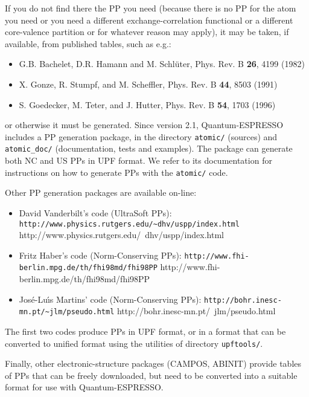 \documentclass[12pt,a4paper]{article}
\begin{document}
If you do not find there the PP you need (because there is no PP for
the atom you need or you need a different exchange-correlation
functional or a different core-valence partition or for whatever
reason may apply), it may be taken, if available, from published
tables, such as e.g.:
\begin{itemize}
  \item G.B. Bachelet, D.R. Hamann and M. Schl\"uter, Phys. Rev. B
        \textbf{26}, 4199 (1982)
  \item X. Gonze, R. Stumpf, and M. Scheffler, Phys. Rev. B
        \textbf{44}, 8503 (1991)
  \item S. Goedecker, M. Teter, and J. Hutter, Phys. Rev. B
        \textbf{54}, 1703 (1996)
\end{itemize}
or otherwise it must be generated. Since version 2.1, Quantum-ESPRESSO 
includes a PP generation package, in the
directory \texttt{atomic/} (sources) and \texttt{atomic\_doc/}
(documentation, tests and examples). 
The package can generate both NC and US PPs in UPF format.
We refer to its documentation for instructions on how to generate PPs
with the \texttt{atomic/} code.

Other PP generation packages are available on-line:

\begin{itemize}
  \item
    David Vanderbilt's code (UltraSoft PPs):\hfill\break
    \htmladdnormallink%
    {\texttt{http://www.physics.rutgers.edu/\~{}dhv/uspp/index.html}}%
    {http://www.physics.rutgers.edu/~dhv/uspp/index.html}
  \item
    Fritz Haber's code (Norm-Conserving PPs):\hfill\break
    \htmladdnormallink%
    {\texttt{http://www.fhi-berlin.mpg.de/th/fhi98md/fhi98PP}}%
    {http://www.fhi-berlin.mpg.de/th/fhi98md/fhi98PP}
  \item
    Jos\'e-Lu\'\i{}s Martins' code (Norm-Conserving PPs):\hfill\break
    \htmladdnormallink%
    {\texttt{http://bohr.inesc-mn.pt/\~{}jlm/pseudo.html}}%
    {http://bohr.inesc-mn.pt/~jlm/pseudo.html}
\end{itemize}

The first two codes produce PPs in UPF format, or in a format that
can be converted to unified format using the utilities of directory
\texttt{upftools/}.

Finally, other electronic-structure packages (CAMPOS, ABINIT)
provide tables of PPs that can be freely downloaded, but need
to be converted into a suitable format for use with Quantum-ESPRESSO.
\end{document}
